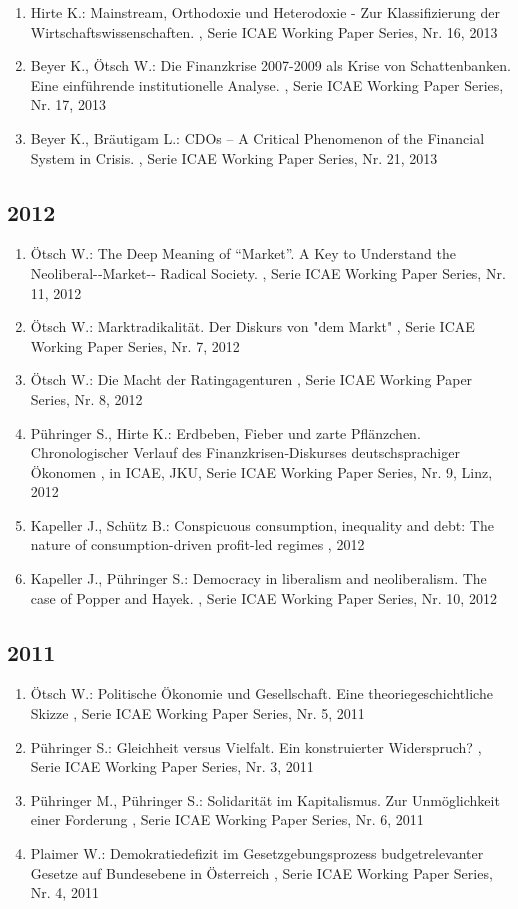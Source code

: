 \begin{enumerate}[leftmargin=*, labelsep=0.5cm]
	 \item Hirte K.:  Mainstream, Orthodoxie und Heterodoxie - Zur Klassifizierung der Wirtschaftswissenschaften.  , Serie ICAE Working Paper Series, Nr. 16, 2013
	 \item Beyer K., Ötsch W.:  Die Finanzkrise 2007-2009 als Krise von Schattenbanken. Eine einführende institutionelle Analyse.  , Serie ICAE Working Paper Series, Nr. 17, 2013
	 \item Beyer K., Bräutigam L.:  CDOs – A Critical Phenomenon of the Financial System in Crisis.  , Serie ICAE Working Paper Series, Nr. 21, 2013
\end{enumerate} 
 \subsection*{2012} 
 \begin{enumerate}[leftmargin=*, labelsep=0.5cm] 
	 \item Ötsch W.:  The Deep Meaning of “Market”. A Key to Understand the Neoliberal-­‐Market-­‐ Radical Society.  , Serie ICAE Working Paper Series, Nr. 11, 2012
	 \item Ötsch W.:  Marktradikalität. Der Diskurs von "dem Markt"  , Serie ICAE Working Paper Series, Nr. 7, 2012
	 \item Ötsch W.:  Die Macht der Ratingagenturen  , Serie ICAE Working Paper Series, Nr. 8, 2012
	 \item Pühringer S., Hirte K.:  Erdbeben, Fieber und zarte Pflänzchen. Chronologischer Verlauf des Finanzkrisen‐Diskurses deutschsprachiger Ökonomen  , in ICAE, JKU, Serie ICAE Working Paper Series, Nr. 9, Linz, 2012
	 \item Kapeller J., Schütz B.:  Conspicuous consumption, inequality and debt: The nature of consumption-driven profit-led regimes  , 2012
	 \item Kapeller J., Pühringer S.:  Democracy in liberalism and neoliberalism. The case of Popper and Hayek.  , Serie ICAE Working Paper Series, Nr. 10, 2012
\end{enumerate} 
 \subsection*{2011} 
 \begin{enumerate}[leftmargin=*, labelsep=0.5cm] 
	 \item Ötsch W.:  Politische Ökonomie und Gesellschaft. Eine theoriegeschichtliche Skizze  , Serie ICAE Working Paper Series, Nr. 5, 2011
	 \item Pühringer S.:  Gleichheit versus Vielfalt. Ein konstruierter Widerspruch?  , Serie ICAE Working Paper Series, Nr. 3, 2011
	 \item Pühringer M., Pühringer S.:  Solidarität im Kapitalismus. Zur Unmöglichkeit einer Forderung  , Serie ICAE Working Paper Series, Nr. 6, 2011
	 \item Plaimer W.:  Demokratiedefizit im Gesetzgebungsprozess budgetrelevanter Gesetze auf Bundesebene in Österreich  , Serie ICAE Working Paper Series, Nr. 4, 2011
\end{enumerate} 
